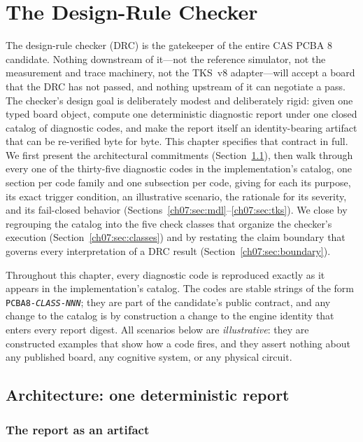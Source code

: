 \chapter{The Design-Rule Checker}\label{ch07:drc}

The design-rule checker (DRC) is the gatekeeper of the entire CAS PCBA 8 candidate. Nothing downstream of it---not the reference simulator, not the measurement and trace machinery, not the TKS~v8 adapter---will accept a board that the DRC has not passed, and nothing upstream of it can negotiate a pass. The checker's design goal is deliberately modest and deliberately rigid: given one typed board object, compute one deterministic diagnostic report under one closed catalog of diagnostic codes, and make the report itself an identity-bearing artifact that can be re-verified byte for byte. This chapter specifies that contract in full. We first present the architectural commitments (Section~\ref{ch07:sec:architecture}), then walk through every one of the thirty-five diagnostic codes in the implementation's catalog, one section per code family and one subsection per code, giving for each its purpose, its exact trigger condition, an illustrative scenario, the rationale for its severity, and its fail-closed behavior (Sections~\ref{ch07:sec:mdl}--\ref{ch07:sec:tks}). We close by regrouping the catalog into the five check classes that organize the checker's execution (Section~\ref{ch07:sec:classes}) and by restating the claim boundary that governs every interpretation of a DRC result (Section~\ref{ch07:sec:boundary}).

Throughout this chapter, every diagnostic code is reproduced exactly as it appears in the implementation's catalog. The codes are stable strings of the form \texttt{PCBA8-\emph{CLASS}-\emph{NNN}}; they are part of the candidate's public contract, and any change to the catalog is by construction a change to the engine identity that enters every report digest. All scenarios below are \emph{illustrative}: they are constructed examples that show how a code fires, and they assert nothing about any published board, any cognitive system, or any physical circuit.

\section{Architecture: one deterministic report}\label{ch07:sec:architecture}

\subsection{The report as an artifact}

